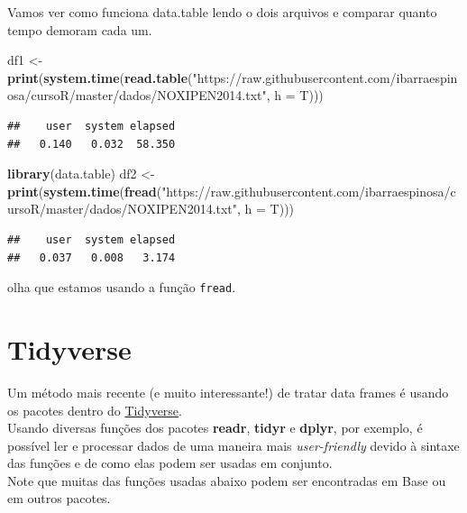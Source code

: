\documentclass[]{book}
\newenvironment{Shaded}{\begin{snugshade}}{\end{snugshade}}
\newcommand{\KeywordTok}[1]{\textcolor[rgb]{0.13,0.29,0.53}{\textbf{#1}}}
\newcommand{\DataTypeTok}[1]{\textcolor[rgb]{0.13,0.29,0.53}{#1}}
\newcommand{\StringTok}[1]{\textcolor[rgb]{0.31,0.60,0.02}{#1}}
\newcommand{\NormalTok}[1]{#1}
\theoremstyle{definition}
\theoremstyle{definition}
\theoremstyle{definition}
\theoremstyle{remark}
\begin{document}
Vamos ver como funciona data.table lendo o dois arquivos e comparar
quanto tempo demoram cada um.

\begin{Shaded}
\begin{Highlighting}[]
\NormalTok{df1 <-}\StringTok{ }\KeywordTok{print}\NormalTok{(}\KeywordTok{system.time}\NormalTok{(}\KeywordTok{read.table}\NormalTok{(}\StringTok{"https://raw.githubusercontent.com/ibarraespinosa/cursoR/master/dados/NOXIPEN2014.txt"}\NormalTok{, }\DataTypeTok{h =}\NormalTok{ T)))}
\end{Highlighting}
\end{Shaded}

\begin{verbatim}
##    user  system elapsed 
##   0.140   0.032  58.350
\end{verbatim}

\begin{Shaded}
\begin{Highlighting}[]
\KeywordTok{library}\NormalTok{(data.table)}
\NormalTok{df2 <-}\StringTok{ }\KeywordTok{print}\NormalTok{(}\KeywordTok{system.time}\NormalTok{(}\KeywordTok{fread}\NormalTok{(}\StringTok{"https://raw.githubusercontent.com/ibarraespinosa/cursoR/master/dados/NOXIPEN2014.txt"}\NormalTok{, }\DataTypeTok{h =}\NormalTok{ T)))}
\end{Highlighting}
\end{Shaded}

\begin{verbatim}
##    user  system elapsed 
##   0.037   0.008   3.174
\end{verbatim}

olha que estamos usando a função \texttt{fread}.

\section{Tidyverse}\label{tidyverse}

Um método mais recente (e muito interessante!) de tratar data frames é
usando os pacotes dentro do
\href{https://www.tidyverse.org/}{Tidyverse}.\\
Usando diversas funções dos pacotes \textbf{readr}, \textbf{tidyr} e
\textbf{dplyr}, por exemplo, é possível ler e processar dados de uma
maneira mais \emph{user-friendly} devido à sintaxe das funções e de como
elas podem ser usadas em conjunto.\\
Note que muitas das funções usadas abaixo podem ser encontradas em Base
ou em outros pacotes.
\end{document}

